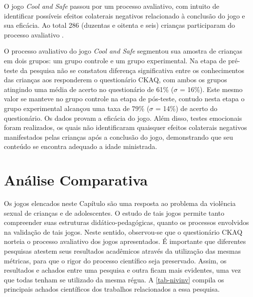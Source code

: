 O jogo \textit{Cool and Safe} passou por um processo avaliativo, com intuito de identificar possíveis efeitos colaterais negativos relacionado à conclusão do jogo e sua eficácia. Ao total 286 (duzentas e oitenta e seis) crianças participaram do processo avaliativo \cite{muller2014child}. 

O processo avaliativo do jogo \textit{Cool and Safe} segmentou sua amostra de crianças em dois grupos: um grupo controle e um grupo experimental. Na etapa de pré-teste da pesquisa não se constatou diferença significativa entre os conhecimentos das crianças aos responderem o questionário \ac{CKAQ}, com ambos os grupos atingindo uma média de acerto no questionário de 61\% ($\sigma$ = 16\%). Este mesmo valor se manteve no grupo controle na etapa de pós-teste, contudo nesta etapa o grupo experimental alcançou uma taxa de 79\%  ($\sigma$ = 14\%) de acerto do questionário. Os dados provam a eficácia do jogo. Além disso, testes emocionais foram realizados, os quais não identificaram quaisquer efeitos colaterais negativos manifestados pelas crianças após a conclusão do jogo, demonstrando que seu conteúdo se encontra adequado a idade ministrada. 



\section{Análise Comparativa}\label{sssec:finais}

Os jogos elencados neste Capítulo são uma resposta ao problema da violência sexual de crianças e de adolescentes. O estudo de tais jogos permite tanto compreender suas estruturas didático-pedagógicas, quanto os processos envolvidos na validação de tais jogos. Neste sentido, observou-se que o questionário \acf{CKAQ} norteia o processo avaliativo dos jogos apresentados. É importante que diferentes pesquisas atestem seus resultados acadêmicos através da utilização das mesmas métricas, para que o rigor do processo científico seja preservado. Assim, os resultados e achados entre uma pesquisa e outra ficam mais evidentes, uma vez que todas tenham se utilizado da mesma régua. A \autoref{tab-nivinv} compila os principais achados científicos dos trabalhos relacionados a essa pesquisa.


